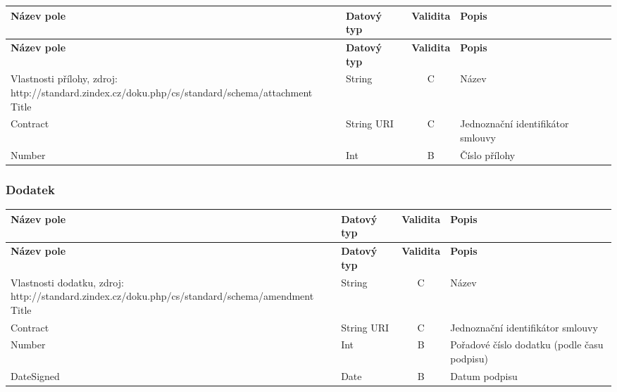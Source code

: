 \begin{center}
\begin{longtable}{lp{20mm}cp{65mm}}
\label{grid_mlmmh} \\
\multicolumn{1}{l}{\textbf{Název pole}} & 
\multicolumn{1}{l}{\textbf{Datový typ}} & 
\multicolumn{1}{l}{\textbf{Validita}} & 
\multicolumn{1}{l}{\textbf{Popis}} \\ \hline 
\endfirsthead
\multicolumn{1}{l}{\textbf{Název pole}} & 
\multicolumn{1}{l}{\textbf{Datový typ}} & 
\multicolumn{1}{l}{\textbf{Validita}} & 
\multicolumn{1}{l}{\textbf{Popis}} \\ \hline 
\hline
\endhead
\endfoot
\caption{Vlastnosti přílohy, zdroj:\\http://standard.zindex.cz/doku.php/cs/standard/schema/attachment}
\endlastfoot
\rowcolor{validateC}Title & String & C & Název \\
\rowcolor{validateC}Contract & String URI & C & Jednoznační identifikátor smlouvy \\
\rowcolor{validateB}Number & Int & B & Číslo přílohy \\
\end{longtable}
\end{center}

\subsubsection*{Dodatek}

\begin{center}
\begin{longtable}{lp{20mm}cp{65mm}}
\label{grid_mlmmh} \\
\multicolumn{1}{l}{\textbf{Název pole}} & 
\multicolumn{1}{l}{\textbf{Datový typ}} & 
\multicolumn{1}{l}{\textbf{Validita}} & 
\multicolumn{1}{l}{\textbf{Popis}} \\ \hline 
\endfirsthead
\multicolumn{1}{l}{\textbf{Název pole}} & 
\multicolumn{1}{l}{\textbf{Datový typ}} & 
\multicolumn{1}{l}{\textbf{Validita}} & 
\multicolumn{1}{l}{\textbf{Popis}} \\ \hline 
\hline
\endhead
\endfoot
\caption{Vlastnosti dodatku, zdroj:\\http://standard.zindex.cz/doku.php/cs/standard/schema/amendment}
\endlastfoot
\rowcolor{validateC}Title & String & C & Název \\
\rowcolor{validateC}Contract & String URI & C & Jednoznační identifikátor smlouvy \\
\rowcolor{validateB}Number & Int & B & Pořadové číslo dodatku (podle času podpisu) \\
\rowcolor{validateB}DateSigned & Date & B & Datum podpisu \\
\end{longtable}
\end{center}

